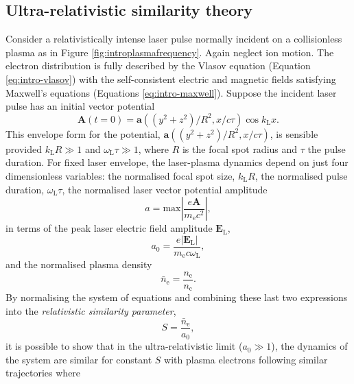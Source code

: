 
\subsection{Ultra-relativistic similarity theory}
Consider a relativistically intense laser pulse normally incident on a collisionless plasma as in Figure \ref{fig:introplasmafrequency}. Again neglect ion motion. The electron distribution is fully described by the Vlasov equation (Equation \ref{eq:intro-vlasov}) with the self-consistent electric and magnetic fields satisfying Maxwell's equations (Equations \ref{eq:intro-maxwell}). Suppose the incident laser pulse has an initial vector potential 
\begin{equation}
	\mathbf{A}(t=0) = \mathbf{a}((y^2+z^2)/R^2,x/c\tau)\cos k_\mathrm{L}x.
\end{equation}
This envelope form for the potential, $\mathbf{a}((y^2+z^2)/R^2,x/c\tau)$, is sensible provided $k_\mathrm{L}R \gg 1$ and $\omega_\mathrm{L}\tau \gg 1$, where $R$ is the focal spot radius and $\tau$ the pulse duration. For fixed laser envelope, the laser-plasma dynamics depend on just four dimensionless variables:  the normalised focal spot size, $k_\mathrm{L} R$, the normalised pulse duration, $\omega_\mathrm{L}\tau$, the normalised laser vector potential amplitude
\begin{equation}
	a = \mathrm{max}\left|\frac{e \mathbf{A} }{m_\mathrm{e} c^2 }\right|,
\end{equation}
in terms of the peak laser electric field amplitude $\mathbf{E}_\mathrm{L}$,
\begin{equation}
	a_0 = \frac{e|\mathbf{E}_\mathrm{L}|}{m_\mathrm{e} c\omega_\mathrm{L}},
\end{equation}
and the normalised plasma density
\begin{equation}
	\bar{n}_\mathrm{e} = \frac{n_\mathrm{e}}{n_\mathrm{c}}.
\end{equation}
By normalising the system of equations and combining these last two expressions into the \textit{relativistic similarity parameter},
\begin{equation}
	S = \frac{\bar{n}_\mathrm{e}}{a_0},
\end{equation}
it is possible to show that in the ultra-relativistic limit ($a_0 \gg 1$), the dynamics of the system are similar for constant $S$ \cite{gordienkoScalingsUltrarelativisticLaser2005} with plasma electrons following similar trajectories where 
